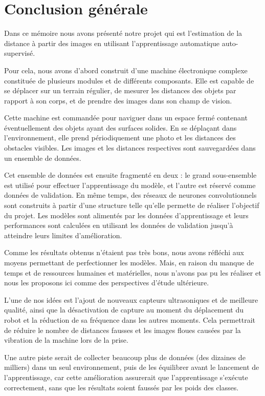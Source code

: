 \chapter*{Conclusion générale}

Dans ce mémoire nous avons présenté notre projet qui est l'estimation de la distance
à partir des images en utilisant l'apprentissage automatique auto-supervisé.

Pour cela, nous avons d'abord construit d'une machine
électronique complexe constituée de plusieurs modules et de différents composants.
Elle est capable de se déplacer sur un terrain régulier, de mesurer
les distances des objets par rapport à son corps, et de prendre des images dans son
champ de vision.

Cette machine est commandée pour naviguer dans un espace fermé contenant éventuellement
des objets ayant des surfaces solides. En se déplaçant dans l'environnement, elle
prend périodiquement une photo et les distances des obstacles visibles. Les images
et les distances respectives sont sauvegardées dans un ensemble de données.

Cet ensemble de données est ensuite fragmenté en deux : le grand sous-ensemble
est utilisé pour effectuer l'apprentissage du modèle, et l'autre est réservé
comme données de validation. En même temps, des réseaux de neurones convolutionnels
sont construits à partir d'une structure telle qu'elle permette de réaliser l'objectif du projet.
Les modèles sont alimentés par les données d'apprentissage et leurs
performances sont calculées en utilisant les données de validation jusqu'à atteindre
leurs limites d'amélioration.

Comme les résultats obtenus n'étaient pas très bons, nous avons réfléchi aux moyens
permettant de perfectionner les modèles. Mais, en raison du manque de temps et
de ressources humaines et matérielles, nous n'avons pas pu les réaliser et nous
les proposons ici comme des perspectives d'étude ultérieure.

L'une de nos idées est l'ajout de nouveaux capteurs ultrasoniques et de meilleure qualité, ainsi
que la désactivation de capture au moment du déplacement du robot et la réduction de
sa fréquence dans les autres moments. Cela permettrait de réduire le nombre de
distances fausses et les images floues causées par la vibration de la machine lors de la prise.

Une autre piste serait de collecter beaucoup plus de données (des dizaines de milliers)
dans un seul environnement, puis de les équilibrer avant le lancement de l'apprentissage,
car cette amélioration assurerait que l'apprentissage s'exécute correctement, sans que les résultats soient
faussés par les poids des classes.

